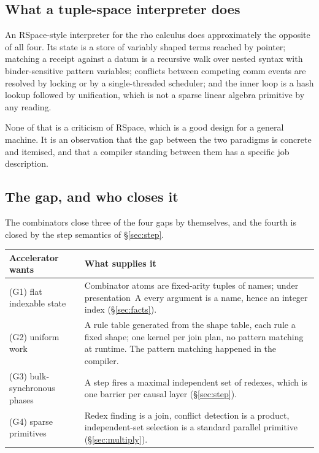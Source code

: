 \documentclass[11pt,a4paper]{article}
\theoremstyle{plain}
\theoremstyle{definition}
\theoremstyle{remark}
\newcommand{\rhoc}{\textsf{rho}}
\begin{document}
\subsection{What a tuple-space interpreter does}

An RSpace-style interpreter for the \rhoc{} calculus does approximately the
opposite of all four. Its state is a store of variably shaped terms reached by
pointer; matching a receipt against a datum is a recursive walk over nested
syntax with binder-sensitive pattern variables; conflicts between competing
comm events are resolved by locking or by a single-threaded scheduler; and the
inner loop is a hash lookup followed by unification, which is not a sparse
linear algebra primitive by any reading.

None of that is a criticism of RSpace, which is a good design for a general
machine. It is an observation that the gap between the two paradigms is
concrete and itemised, and that a compiler standing between them has a
specific job description.

\subsection{The gap, and who closes it}

The combinators close three of the four gaps by themselves, and the fourth is
closed by the step semantics of \S\ref{sec:step}.

\begin{center}
\begin{tabular}{@{}L{0.31\textwidth}L{0.60\textwidth}@{}}
\toprule
\textbf{Accelerator wants} & \textbf{What supplies it} \\
\midrule
(G1) flat indexable state &
  Combinator atoms are fixed-arity tuples of names; under presentation~A every
  argument is a name, hence an integer index (\S\ref{sec:facts}). \\
(G2) uniform work &
  A rule table generated from the shape table, each rule a fixed shape; one
  kernel per join plan, no pattern matching at runtime. The pattern matching happened in the compiler. \\
(G3) bulk-synchronous phases &
  A step fires a maximal independent set of redexes, which is one barrier per
  causal layer (\S\ref{sec:step}). \\
(G4) sparse primitives &
  Redex finding is a join, conflict detection is a product, independent-set
  selection is a standard parallel primitive (\S\ref{sec:multiply}). \\
\bottomrule
\end{tabular}
\end{center}
\end{document}
